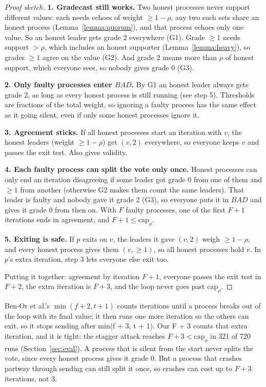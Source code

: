 \documentclass[conference]{IEEEtran}
\theoremstyle{definition}
\newcommand{\capr}{\mathrm{cap}_\rho}
\newcommand{\BAD}{\mathit{BAD}}
\begin{document}
\begin{proof}[Proof sketch]
\textbf{1. Gradecast still works.} Two honest processes never support different values: each needs echoes of weight $\ge1-\rho$, any two such sets share an honest process (Lemma~\ref{lemma:quorum}), and that process echoes only one value. So an honest leader gets grade 2 everywhere (G1). Grade $\ge1$ needs support $>\rho$, which includes an honest supporter (Lemma~\ref{lemma:heavy}), so grades $\ge1$ agree on the value (G2). And grade 2 means more than $\rho$ of honest support, which everyone sees, so nobody gives grade 0 (G3).

\textbf{2. Only faulty processes enter $\BAD$.} By G1 an honest leader always gets grade 2, as long as every honest process is still running (see step 5). Thresholds are fractions of the total weight, so ignoring a faulty process has the same effect as it going silent, even if only some honest processes ignore it.

\textbf{3. Agreement sticks.} If all honest processes start an iteration with $v$, the honest leaders (weight $\ge1-\rho$) get $(v,2)$ everywhere, so everyone keeps $v$ and passes the exit test. Also gives validity.

\textbf{4. Each faulty process can split the vote only once.} Honest processes can only end an iteration disagreeing if some leader got grade 0 from one of them and $\ge1$ from another (otherwise G2 makes them count the same leaders). That leader is faulty and nobody gave it grade 2 (G3), so everyone puts it in $\BAD$ and gives it grade 0 from then on. With $F$ faulty processes, one of the first $F+1$ iterations ends in agreement, and $F+1\le\capr$.

\textbf{5. Exiting is safe.} If $p$ exits on $v$, the leaders it gave $(v,2)$ weigh $\ge1-\rho$, and every honest process gives them $(v,\ge1)$, so all honest processes hold $v$. In $p$'s extra iteration, step 3 lets everyone else exit too.

Putting it together: agreement by iteration $F+1$, everyone passes the exit test in $F+2$, the extra iteration is $F+3$, and the loop never goes past $\capr$.
\end{proof}

Ben-Or et al.'s $\min(f+2,t+1)$ counts iterations until a process breaks out of the loop with its final value; it then runs one more iteration so the others can exit, so it stops sending after min(f + 3, t + 1). Our F + 3 counts that extra iteration, and it is tight: the stagger attack reaches $F+3<\capr$ in 321 of 720 runs (Section~\ref{sec:eval}). A process that is silent from the start never splits the vote, since every honest process gives it grade 0. But a process that crashes partway through sending can still split it once, so crashes can cost up to $F+3$ iterations, not 3.
\end{document}
